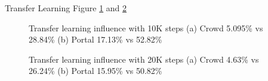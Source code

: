 \documentclass[a4paper]{article}
\begin{document}
Transfer Learning Figure \ref{fig:wer10k} and \ref{fig:wer20k}

\begin{figure}
    \centering
    \caption{Transfer learning influence with 10K steps (a) Crowd 5.095\% vs 28.84\% (b) Portal 17.13\% vs 52.82\%}
    \label{fig:wer10k}
\end{figure}


\begin{figure}
    \centering
    \caption{Transfer learning influence with 20K steps (a) Crowd 4.63\% vs 26.24\%  (b) Portal 15.95\% vs 50.82\%}
    \label{fig:wer20k}
\end{figure}
\end{document}
